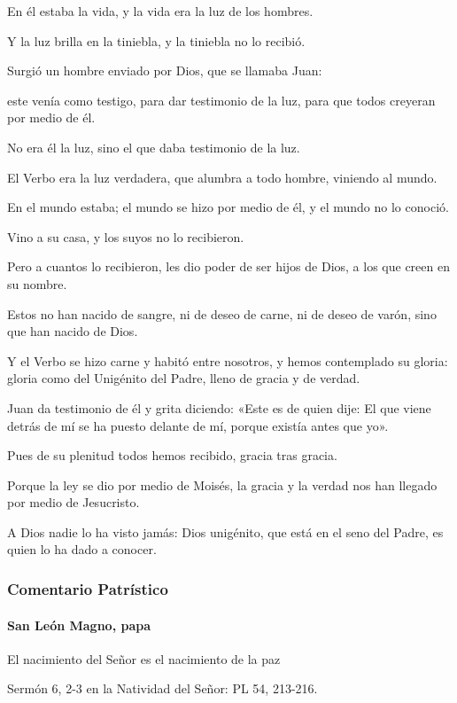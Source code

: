 \documentclass[]{article}
\let\oldparagraph\paragraph
\renewcommand{\paragraph}[1]{\oldparagraph{#1}\mbox{}}
\begin{document}
En él estaba la vida, y la vida era la luz de los hombres.

Y la luz brilla en la tiniebla, y la tiniebla no lo recibió.

Surgió un hombre enviado por Dios, que se llamaba Juan:

este venía como testigo, para dar testimonio de la luz, para que todos
creyeran por medio de él.

No era él la luz, sino el que daba testimonio de la luz.

El Verbo era la luz verdadera, que alumbra a todo hombre, viniendo al
mundo.

En el mundo estaba; el mundo se hizo por medio de él, y el mundo no lo
conoció.

Vino a su casa, y los suyos no lo recibieron.

Pero a cuantos lo recibieron, les dio poder de ser hijos de Dios, a los
que creen en su nombre.

Estos no han nacido de sangre, ni de deseo de carne, ni de deseo de
varón, sino que han nacido de Dios.

Y el Verbo se hizo carne y habitó entre nosotros, y hemos contemplado su
gloria: gloria como del Unigénito del Padre, lleno de gracia y de
verdad.

Juan da testimonio de él y grita diciendo: «Este es de quien dije: El
que viene detrás de mí se ha puesto delante de mí, porque existía antes
que yo».

Pues de su plenitud todos hemos recibido, gracia tras gracia.

Porque la ley se dio por medio de Moisés, la gracia y la verdad nos han
llegado por medio de Jesucristo.

A Dios nadie lo ha visto jamás: Dios unigénito, que está en el seno del
Padre, es quien lo ha dado a conocer.

\subsubsection{Comentario Patrístico}\label{comentario-patruxedstico-10}

\paragraph{San León Magno, papa}\label{san-leuxf3n-magno-papa-1}

El nacimiento del Señor es el nacimiento de la paz

Sermón 6, 2-3 en la Natividad del Señor: PL 54, 213-216.
\end{document}
